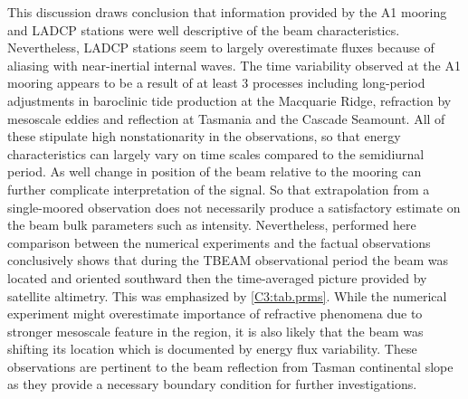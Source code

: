 \documentclass[12pt]{article}
\begin{document}
This discussion draws conclusion that information provided by the A1 mooring and LADCP stations 
were well descriptive of the beam characteristics. Nevertheless, LADCP stations seem to 
largely overestimate fluxes because of aliasing with near-inertial internal waves. The time 
variability observed at the A1 mooring appears to be a result of at least 3 processes including 
long-period adjustments in baroclinic tide production at the Macquarie Ridge, refraction by 
mesoscale eddies and reflection at Tasmania and the Cascade Seamount. All of these stipulate high 
nonstationarity in the observations, so that energy characteristics can largely vary on 
time scales compared to the semidiurnal period. As well change in position of the beam relative to 
the mooring can further complicate interpretation of the signal. So that extrapolation from a 
single-moored observation does not necessarily produce a satisfactory estimate on the beam bulk 
parameters such as intensity. Nevertheless, performed here comparison between the numerical 
experiments and the factual observations conclusively shows that during the TBEAM observational 
period the beam was located and oriented southward then the time-averaged picture provided 
by satellite altimetry. This was emphasized by \ref{C3:tab.prms}. While the numerical experiment 
might overestimate importance of refractive phenomena due to stronger mesoscale feature in the 
region, it is also likely that the beam was shifting its location which is documented by energy 
flux variability. These observations are pertinent to the beam reflection from Tasman continental 
slope as they provide a necessary boundary condition for further investigations.
\end{document}
